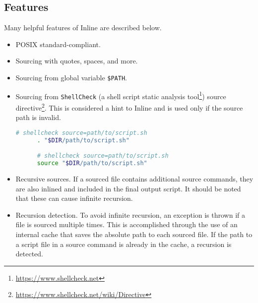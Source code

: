 \subsection{Features}
\label{subsec:corollary_projects_inline_features}

Many helpful features of Inline are described below.

\begin{itemize}
  \item POSIX standard-compliant.

  \item Sourcing with quotes, spaces, and more.

  \item Sourcing from global variable \texttt{\$PATH}.

  \item Sourcing from \texttt{ShellCheck} (a shell script static analysis tool\footnote{\url{https://www.shellcheck.net}})
    source directive\footnote{\url{https://www.shellcheck.net/wiki/Directive}}.
    \newline
    This is considered a hint to Inline and is used only if the source path is invalid.
    \newline
    \begin{lstlisting}[language=sh, morekeywords={., source}, numbers=none, aboveskip=0pt, belowskip=0pt, abovecaptionskip=0pt, belowcaptionskip=0pt]
      # shellcheck source=path/to/script.sh
      . "$DIR/path/to/script.sh"

      # shellcheck source=path/to/script.sh
      source "$DIR/path/to/script.sh"
    \end{lstlisting}

  \item Recursive sources. If a sourced file contains additional source commands,
    they are also inlined and included in the final output script.
    \newline
    It should be noted that these can cause infinite recursion.

  \item Recursion detection. To avoid infinite recursion, an exception is thrown
    if a file is sourced multiple times. This is accomplished through the use of
    an internal cache that saves the absolute path to each sourced file. If the path
    to a script file in a source command is already in the cache, a recursion is
    detected.


\end{itemize}
